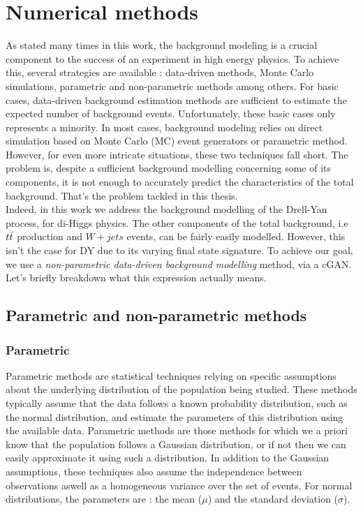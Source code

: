\section{Numerical methods}

As stated many times in this work, the background modeling is a crucial component to the success of an experiment in high energy physics. To achieve this, several strategies are available : data-driven methods, Monte Carlo simulations, parametric and non-parametric methods among others. For basic cases, data-driven background estimation methods are sufficient to estimate the expected number of background events. Unfortunately, these basic cases only represents a minority. In most cases, background modeling relies on direct simulation based on Monte Carlo (MC) event generators or parametric method.\\
However, for even more intricate situations, these two techniques fall short. The problem is, despite a sufficient background modelling concerning some of its components, it is not enough to accurately predict the characteristics of the total background. That's the problem tackled in this thesis.\\
Indeed, in this work we address the background modelling of the Drell-Yan process, for di-Higgs physics. The other components of the total background, i.e $t \Bar{t}$ production and $W+jets$ events, can be fairly easily modelled. However, this isn't the case for DY due to its varying final state signature. To achieve our goal, we use a \textit{non-parametric data-driven background modelling} method, via a cGAN. Let's briefly breakdown what this expression actually means.

\subsection{Parametric and non-parametric methods}

\subsubsection*{Parametric}
Parametric methods are statistical techniques relying on specific assumptions about the underlying distribution of the population being studied. These methods typically assume that the data follows a known probability distribution, such as the normal distribution, and estimate the parameters of this distribution using the available data. Parametric methods are those methods for which we a priori know that the population follows a Gaussian distribution, or if not then we can easily approximate it using such a distribution. In addition to the Gaussian assumptions, these techniques also assume the independence between observations aswell as a homogeneous variance over the set of events.
For normal distributions, the parameters are : the mean ($\mu$) and the standard deviation ($\sigma$).\\

